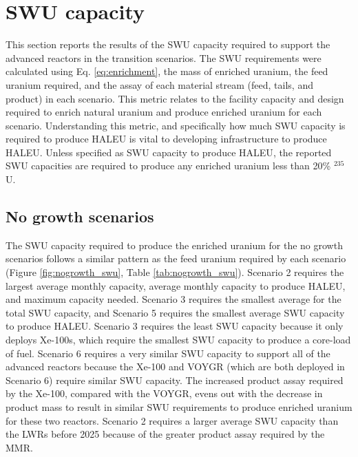 \section{SWU capacity}
This section reports the results of the \gls{SWU} capacity 
required to support the advanced reactors in the transition 
scenarios. The \gls{SWU} requirements were calculated using 
Eq. \ref{eq:enrichment},  
the mass of enriched uranium, the feed uranium required, 
and the assay of each material stream (feed, tails, and product)
in each scenario. This metric relates to the facility capacity 
and design required to enrich natural uranium and produce 
enriched uranium for each scenario. Understanding this metric, 
and specifically how much \gls{SWU} capacity is required to 
produce \gls{HALEU} is vital to developing infrastructure to 
produce \gls{HALEU}. Unless specified as \gls{SWU} capacity to 
produce \gls{HALEU}, the reported \gls{SWU} capacities are 
required to produce any enriched uranium less than 20\% 
$^{235}$U. 

\subsection{No growth scenarios} \label{sec:nogrowth_swu}
The \gls{SWU} capacity required to produce the enriched uranium for 
the no growth scenarios follows a similar pattern as 
the feed uranium required by each scenario (Figure \ref{fig:nogrowth_swu}, 
Table \ref{tab:nogrowth_swu}). Scenario 2 requires the largest average 
monthly capacity, average monthly capacity to produce \gls{HALEU}, and maximum 
capacity needed. Scenario 3 requires the smallest average for the total 
\gls{SWU} capacity, 
and Scenario 5 requires the smallest average 
\gls{SWU} capacity to produce \gls{HALEU}. Scenario 3 requires the least 
\gls{SWU} capacity because it only deploys Xe-100s, which require the 
smallest \gls{SWU} capacity to produce a core-load of fuel. Scenario 
6 requires a very similar \gls{SWU} capacity to support all of the 
advanced reactors because the Xe-100 and VOYGR (which are both deployed 
in Scenario 6) require similar \gls{SWU} capacity. The increased 
product assay required by the Xe-100, compared with the VOYGR, evens 
out with the decrease in product mass to result in similar \gls{SWU} 
requirements to produce enriched uranium for these two reactors. 
Scenario 2 requires a larger average \gls{SWU} capacity 
than the \glspl{LWR} before 2025 because of the greater product 
assay required by the \gls{MMR}. 

